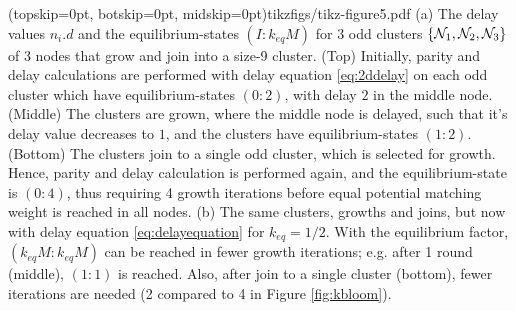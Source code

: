 \Figure[htb](topskip=0pt, botskip=0pt, midskip=0pt){tikzfigs/tikz-figure5.pdf}{
    (a) The delay values $n_i.d$ and the equilibrium-states $(I:k_{eq}M)$ for 3 odd clusters $\{\mathcal{N}_1, \mathcal{N}_2, \mathcal{N}_3\}$ of 3 nodes that grow and join into a size-9 cluster. (Top) Initially, parity and delay calculations  are performed with delay equation \eqref{eq:2ddelay} on each odd cluster which have equilibrium-states $(0:2)$, with delay $2$ in the middle node. (Middle) The clusters are grown, where the middle node is delayed, such that it's delay value decreases to $1$, and the clusters have equilibrium-states $(1:2)$. (Bottom) The clusters join to a single odd cluster, which is selected for growth. Hence, parity and delay calculation is performed again, and the equilibrium-state is $(0:4)$, thus requiring 4 growth iterations before equal potential matching weight is reached in all nodes.  (b) The same clusters, growths and joins, but now with delay equation \eqref{eq:delayequation} for $k_{eq} = 1/2$. With the equilibrium factor, $(k_{eq}M:k_{eq}M)$ can be reached in fewer growth iterations; e.g. after 1 round (middle), $(1:1)$ is reached. Also, after join to a single cluster (bottom), fewer iterations are needed (2 compared to 4 in Figure \ref{fig:kbloom}).\label{fig5}}